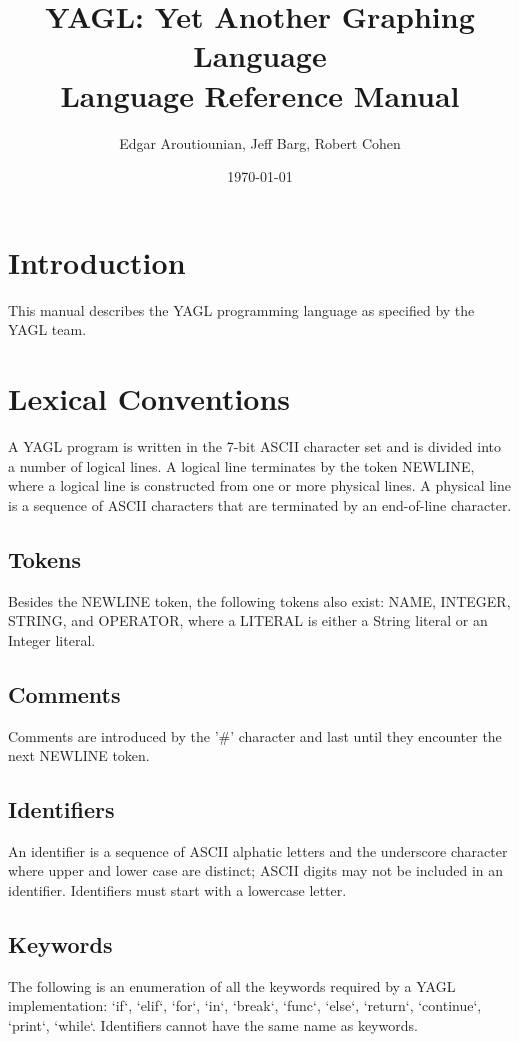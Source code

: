 \documentclass[12pt]{article}
\begin{document}
\title{YAGL: Yet Another Graphing Language\\Language Reference Manual}
\author{Edgar Aroutiounian, Jeff Barg, Robert Cohen}
\date{\today}
\maketitle


\section{Introduction}
This manual describes the YAGL programming language as specified by the YAGL team. 

\section{Lexical Conventions}
A YAGL program is written in the 7-bit ASCII character set and is divided into a number of logical lines. A logical line terminates by the token NEWLINE, where a logical line is constructed from one or more physical lines. A physical line is a sequence of ASCII characters that are terminated by an end-of-line character.

\subsection{Tokens}
Besides the NEWLINE token, the following tokens also exist: NAME, INTEGER, STRING, and OPERATOR, where a LITERAL is either a String literal or an Integer literal.  

\subsection{Comments} 
Comments are introduced by the '\#' character and last until they encounter the next NEWLINE token.

\subsection{Identifiers}
An identifier is a sequence of ASCII alphatic letters and the underscore character where upper and lower case are distinct; ASCII digits may not be included in an identifier.  Identifiers must start with a lowercase letter.

\subsection{Keywords}
The following is an enumeration of all the keywords required by a YAGL implementation:
`if`, `elif`, `for`, `in`, `break`, `func`, `else`, `return`, `continue`, `print`, `while`.  Identifiers cannot have the same name as keywords.
\end{document}

